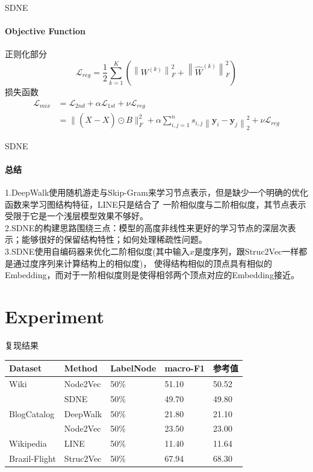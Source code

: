 \documentclass{beamer}
\begin{document}
\begin{frame}{SDNE}
    \framesubtitle{Objective Function}
    正则化部分
    $$
    \mathcal{L}_{r e g}=\frac{1}{2} \sum_{k=1}^{K}\left(\left\|W^{(k)}\right\|_{F}^{2}+\left\|\hat{W}^{(k)}\right\|_{F}^{2}\right)
    $$
    损失函数
    $$
    \begin{aligned}
    \mathcal{L}_{m i x} &=\mathcal{L}_{2 n d}+\alpha \mathcal{L}_{1 s t}+\nu \mathcal{L}_{r e g} \\
    &=\|(\hat{X}-X) \odot B\|_{F}^{2}+\alpha \sum_{i, j=1}^{n} s_{i, j}\left\|\mathbf{y}_{i}-\mathbf{y}_{j}\right\|_{2}^{2}+\nu \mathcal{L}_{r e g}
    \end{aligned}
    $$
\end{frame}
\begin{frame}{SDNE}
    \framesubtitle{总结}
    1.DeepWalk使用随机游走与Skip-Gram来学习节点表示，但是缺少一个明确的优化函数来学习图结构特征，LINE只是结合了
    一阶相似度与二阶相似度，其节点表示受限于它是一个浅层模型效果不够好。\\
    2.SDNE的构建思路围绕三点：模型的高度非线性来更好的学习节点的深层次表示；能够很好的保留结构特性；如何处理稀疏性问题。\\
    3.SDNE使用自编码器来优化二阶相似度(其中输入$x$是度序列，跟Struc2Vec一样都是通过度序列来计算结构上的相似度)，
    使得结构相似的顶点具有相似的Embedding，而对于一阶相似度则是使得相邻两个顶点对应的Embedding接近。
\end{frame}
\section{Experiment}
\begin{frame}{复现结果}
    \begin{table}[]
        \begin{tabular}{|l|l|l|l|l|}
        \hline
        Dataset       & Method    & LabelNode & macro-F1 & 参考值 \\ \hline
        Wiki          & Node2Vec  & 50\%      & 51.10    & 50.52  \\ \hline
                      & SDNE      & 50\%      & 49.70    & 49.80  \\ \hline
        BlogCatalog   & DeepWalk  & 50\%      & 21.80    & 21.10  \\ \hline
                      & Node2Vec  & 50\%      & 23.50    & 23.00  \\ \hline
        Wikipedia     & LINE      & 50\%      & 11.40    & 11.64  \\ \hline
        Brazil-Flight & Struc2Vec & 50\%      & 67.94    & 68.30  \\ \hline
        \end{tabular}
    \end{table}
\end{frame}
\end{document}
